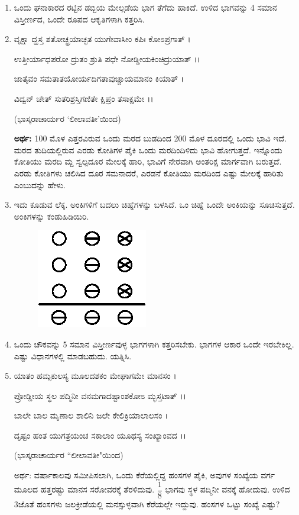 \begin{enumerate}
\item ಒಂದು ಘನಾಕಾರದ ರಟ್ಟಿನ ಡಬ್ಬಿಯ ಮೇಲ್ಗಡೆಯ ಭಾಗ ತೆಗೆದು ಹಾಕಿದೆ. ಉಳಿದ ಭಾಗವನ್ನು 4 ಸಮಾನ ವಿಸ್ತೀರ್ಣದ, ಒಂದೇ ರೂಪದ ಆಕೃತಿಗಳಾಗಿ ಕತ್ತರಿಸಿ. 

\item ವೃಕ್ಷಾ ದ್ಹಸ್ತ ಶತೋಚ್ಛ್ರಯಾಚ್ಛತ ಯುಗೇವಾಸೀಂ ಕಪಿಃ ಕೋಽಪ್ರಗಾತ್ ।

ಉತ್ತೀರ್ಯಾಧಪರೋ ದ್ರುತಂ ಶ್ರುತಿ ಪಧೇ ನೋಡ್ಡೀಯಕಿಂಚಿದ್ರುಯಾತ್ ।।

ಜಾತೈವಂ ಸಮತಾತಯೋರ್ಯದಿಗತಾವುಚ್ಚಾಯಮಾನಂ ಕಿಯಾತ್ ।

ವಿದ್ವನ್ ಚೇತ್ ಸುತರಿಶ್ರಸ್ತಿಗಣಿತೇ ಕ್ಷಿಪ್ರಂ ತಸಾಕ್ಷಮೇ ।।

\hfill (ಭಾಸ್ಕರಾಚಾರ್ಯರ `ಲೀಲಾವತೀ'ಯಿಂದ)

{\bf ಅರ್ಥ:}  100 ಮೊಳ ಎತ್ತರವಿರುವ ಒಂದು ಮರದ ಬುಡದಿಂದ 200  ಮೊಳ ದೂರದಲ್ಲಿ ಒಂದು ಭಾವಿ ಇದೆ. ಮರದ ತುದಿಯಲ್ಲಿರುವ ಎರಡು ಕೋತಿಗಳ ಪೈಕಿ ಒಂದು ಮರದಿಂದಿಳಿದು ಭಾವಿ ಹೋಗುತ್ತದೆ. ಇನ್ನೊಂದು ಕೋತಿಯು ಮರದಿ ಮ್ದ ಸ್ವಲ್ಪದೂರ ಮೇಲಕ್ಕೆ ಹಾರಿ, ಭಾವಿಗೆ ನೇರವಾಗಿ ಅಂತರಿಕ್ಷ ಮಾರ್ಗವಾಗಿ ಬರುತ್ತದೆ. ಎರಡು ಕೋತಿಗಳು ಚಲಿಸಿದ ದೂರ ಸಮನಾದರೆ, ಎರಡನೆ ಕೋತಿಯು ಮರದಿಂದ ಎಷ್ಟು ಮೇಲಕ್ಕೆ ಹಾರಿತು ಎಂಬುದನ್ನು ಹೇಳು. 

\item ಇದು ಕೂಡುವ ಲೆಕ್ಕ. ಅಂಕಿಗಳಿಗೆ ಬದಲು ಚಿಹ್ನೆಗಳನ್ನು ಬಳಸಿದೆ. ಒಂ ಚಿಹ್ನೆ ಒಂದೇ ಅಂಕಿಯನ್ನು ಸೂಚಿಸುತ್ತದೆ. ಅಂಕಿಗಳನ್ನು ಕಂಡುಹಿಡಿಯಿರಿ. 
\begin{figure}[H]
\centering
\includegraphics{images/chap12/q24.eps}
\end{figure}


\item ಒಂದು ಚೌಕವನ್ನು 5 ಸಮಾನ ವಿಸ್ತೀರ್ಣವುಳ್ಳ ಭಾಗಗಳಾಗಿ ಕತ್ತರಿಸಬೇಕು. ಭಾಗಗಳ ಆಕಾರ ಒಂದೇ ಇರಬೇಕಿಲ್ಲ. ಎಷ್ಟು ವಿಧಾನಗಳಲ್ಲಿ ಮಾಡಬಹುದು. ಯತ್ನಿಸಿ.  

\item ಯಾತಂ ಹಮ್ಸಕುಲಸ್ಯ ಮೂಲದಶಕಂ ಮೇಘಾಗಮೇ ಮಾನಸಂ ।

ಪ್ರೋಡ್ಡೀಯ ಸ್ಥಲ ಪದ್ಮಿನೀ ವನಮಗಾದಷ್ಟಾಂಶಕೋಽ ಮ್ಭಸ್ತಟಾತ್ ।।

ಬಾಲೇ ಬಾಲ ಮೃಣಾಲ ಶಾಲಿನಿ ಜಲೇ ಕೇಲಿಕ್ರಿಯಾಲಾಲಸಂ ।

ದೃಷ್ಟಂ ಹಂತ ಯುಗತ್ರಯಂಚ ಸಕಾಲಾಂ ಯೂಥಸ್ಯ ಸಂಖ್ಯಾಂವದ ।।

\hfill (ಭಾಸ್ಕರಾಚಾರ್ಯರ ``ಲೀಲಾವತೀ"ಯಿಂದ)


ಅರ್ಥ: ವರ್ಷಾಕಾಲವು ಸಮೀಪಿಸಲಾಗಿ, ಒಂದು ಕೆರೆಯಲ್ಲಿದ್ದ ಹಂಸಗಳ ಪೈಕಿ, ಅವುಗಳ ಸಂಖ್ಯೆಯ ವರ್ಗ ಮೂಲದ ಹತ್ತರಷ್ಟು ಮಾನಸ ಸರೋವರಕ್ಕೆ ತೆರಳಿದುವು. $\dfrac{1}{8}$ ಭಾಗವು ಸ್ಥಳ ಪದ್ಮಿನೀ ವನಕ್ಕೆ ಹೋದುವು. ಉಳಿದ 3ಜೊತೆ ಹಂಸಗಳು ಜಲಕ್ರೀಡೆಯಲ್ಲಿ ಮನಸ್ಸುಳ್ಳವಾಗಿ ಕೆರೆಯಲ್ಲೇ ಇದ್ದುವು. ಹಂಸಗಳ ಒಟ್ಟು ಸಂಖ್ಯೆ ಎಷ್ಟು? 


\end{enumerate}

